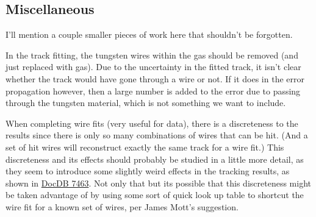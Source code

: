 	\subsection{Miscellaneous}

		I'll mention a couple smaller pieces of work here that shouldn't be forgotten.

		In the track fitting, the tungsten wires within the gas should be removed (and just replaced with gas). Due to the uncertainty in the fitted track, it isn't clear whether the track would have gone through a wire or not. If it does in the error propagation however, then a large number is added to the error due to passing through the tungsten material, which is not something we want to include.

		When completing wire fits (very useful for data), there is a discreteness to the results since there is only so many combinations of wires that can be hit. (And a set of hit wires will reconstruct exactly the same track for a wire fit.)  This discreteness and its effects should probably be studied in a little more detail, as they seem to introduce some slightly weird effects in the tracking results, as shown in \href{https://gm2-docdb.fnal.gov/cgi-bin/private/ShowDocument?docid=7463}{DocDB 7463}. Not only that but its possible that this discreteness might be taken advantage of by using some sort of quick look up table to shortcut the wire fit for a known set of wires, per James Mott's suggestion.



